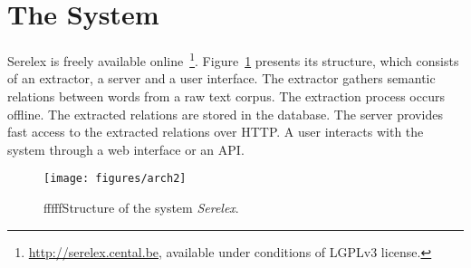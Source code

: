\documentclass[runningheads,a4paper]{llncs}
\begin{document}





\section{The System}

Serelex is freely available online~\footnote{ \url{http://serelex.cental.be}, available under conditions of LGPLv3 license.}. Figure~\ref{fig:architecture} presents its structure, which consists of an extractor, a server and a user interface. The extractor gathers semantic relations between words from a raw text corpus. The extraction process occurs offline. The extracted relations are stored in the database. The server provides fast access to the extracted relations over HTTP. A user interacts with the system through a web interface or an API. %


\begin{figure}
	\centering
		\texttt{[image: figures/arch2]} 
		\caption{fffffStructure of the system \textit{Serelex}.}
			\label{fig:architecture}
\end{figure}
\end{document}
